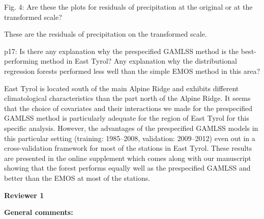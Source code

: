 \documentclass[american,foldmarks=false,noconfig]{uibklttr}
\newenvironment{review}{\fontshape{\itdefault}\fontseries{\bfdefault} \selectfont \smallskip}{\par}
\begin{document}
\begin{review}
Fig. 4: Are these the plots for residuals of precipitation 
at the original or at the transformed scale?
\end{review}

These are the residuals of precipitation on the transformed scale.

\begin{review}
p17: Is there any explanation why the prespecified GAMLSS 
method is the best-performing method in East Tyrol? Any 
explanation why the distributional regression forests 
performed less well than the simple EMOS method in this area?
\end{review}

East Tyrol is located south of the main Alpine Ridge and exhibits different
climatological characteristics than the part north of the Alpine Ridge.  It
seems that the choice of covariates and their interactions we made for the
prespecified GAMLSS method is particularly adequate for the region of East
Tyrol for this specific analysis. However, the advantages of the prespecified
GAMLSS models in this particular setting (training: 1985--2008, validation:
2009--2012) even out in a cross-validation framework for most of the stations
in East Tyrol. These results are presented in the online supplement which comes
along with our manuscript showing that the forest performs equally well as the
prespecified GAMLSS and better than the EMOS at most of the stations.


\newpage


\textbf{\LARGE Reviewer 1}

\bigskip

\textbf{General comments:}
\end{document}
